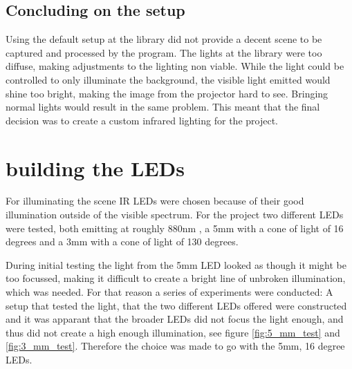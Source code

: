 \subsection{Concluding on the setup}
Using the default setup at the library did not provide a decent scene to be captured and processed by the program. The lights at the library were too diffuse, making adjustments to the lighting non viable. While the light could be controlled to only illuminate the background, the visible light emitted would shine too bright, making the image from the projector hard to see. Bringing normal lights would result in the same problem. This meant that the final decision was to create a custom infrared lighting for the project.

\section{building the LEDs}
For illuminating the scene IR LEDs were chosen because of their good illumination outside of the visible spectrum. For the project two different LEDs were tested, both emitting at roughly 880nm \citep{5mm_led} \citep{3mm_led}, a 5mm with a cone of light of 16 degrees and a 3mm with a cone of light of 130 degrees.

During initial testing the light from the 5mm LED looked as though it might be too focussed, making it difficult to create a bright line of unbroken illumination, which was needed. For that reason a series of experiments were conducted: A setup that tested the light, that the two different LEDs offered were constructed and it was apparant that the broader LEDs did not focus the light enough, and thus did not create a high enough illumination, see figure \ref{fig:5_mm_test} and \ref{fig:3_mm_test}. Therefore the choice was made to go with the 5mm, 16 degree LEDs.


